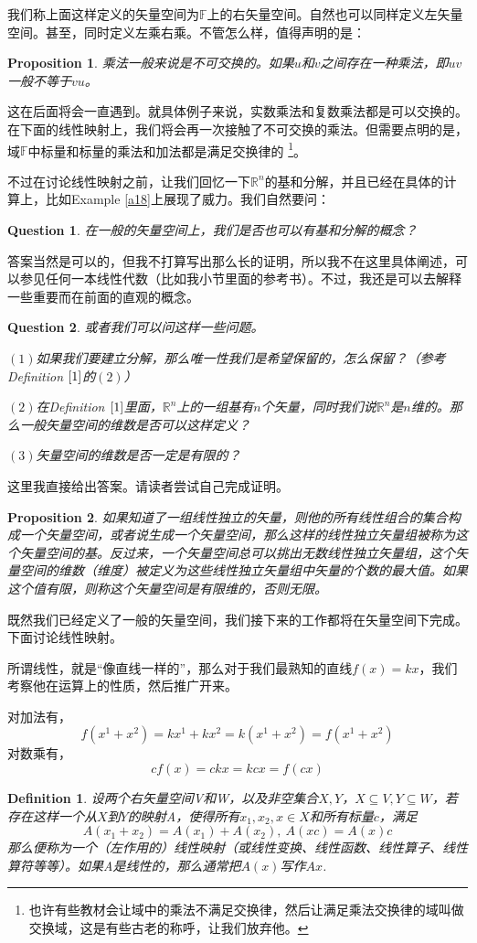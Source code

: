 \documentclass[11pt,a4paper,openany]{book}%
\theoremstyle{plain}%
\newtheorem{pro}{Proposition}[chapter]%
\newtheorem{que}{Question}[chapter]%
\newtheorem{defi}{Definition}[chapter]%
\newcommand{\NO}[1]{{$(#1)$}}%
\newcommand{\dref}[1]{{\rm Definition} $\ref{#1}$}%
\begin{document}
我们称上面这样定义的矢量空间为$\mathbb{F}$上的右矢量空间。自然也可以同样定义左矢量空间。甚至，同时定义左乘右乘。不管怎么样，值得声明的是：
\begin{pro}
\label{乘法}
乘法一般来说是不可交换的。如果$u$和$v$之间存在一种乘法，即$uv$一般不等于$vu$。
\end{pro}
这在后面将会一直遇到。就具体例子来说，实数乘法和复数乘法都是可以交换的。在下面的线性映射上，我们将会再一次接触了不可交换的乘法。但需要点明的是，域$\mathbb{F}$中标量和标量的乘法和加法都是满足交换律的
\footnote{也许有些教材会让域中的乘法不满足交换律，然后让满足乘法交换律的域叫做交换域，这是有些古老的称呼，让我们放弃他。}。

\indent 不过在讨论线性映射之前，让我们回忆一下$\mathbb{R}^{n}$的基和分解，并且已经在具体的计算上，比如Example \ref{a18}上展现了威力。我们自然要问：
\begin{que}
\label{a14}
在一般的矢量空间上，我们是否也可以有基和分解的概念？
\end{que}

答案当然是可以的，但我不打算写出那么长的证明，所以我不在这里具体阐述，可以参见任何一本线性代数（比如我小节里面的参考书）。不过，我还是可以去解释一些重要而在前面的直观的概念。
\begin{que}\label{a15}或者我们可以问这样一些问题。

\NO{1}如果我们要建立分解，那么唯一性我们是希望保留的，怎么保留？（参考 \dref{1}的\NO{2}）

\NO{2}在\dref{1}里面，$\mathbb{R}^{n}$上的一组基有$n$个矢量，同时我们说$\mathbb{R}^{n}$是$n$维的。那么一般矢量空间的维数是否可以这样定义？

\NO{3}矢量空间的维数是否一定是有限的？
\end{que}
这里我直接给出答案。请读者尝试自己完成证明。
\begin{pro}
\label{ji}
如果知道了一组线性独立的矢量，则他的所有线性组合的集合构成一个矢量空间，或者说生成一个矢量空间，那么这样的线性独立矢量组被称为这个矢量空间的{\kaishu 基}。反过来，一个矢量空间总可以挑出无数线性独立矢量组，这个矢量空间的维数（维度）被定义为这些线性独立矢量组中矢量的个数的最大值。如果这个值有限，则称这个矢量空间是有限维的，否则无限。
\end{pro}
既然我们已经定义了一般的矢量空间，我们接下来的工作都将在矢量空间下完成。下面讨论线性映射。

所谓线性，就是“像直线一样的”，那么对于我们最熟知的直线$f(x)=kx$，我们考察他在运算上的性质，然后推广开来。

对加法有，
\[
f(x^{1}+x^{2})=kx^{1}+kx^{2}=k(x^1+x^2)=f(x^1+x^2)
\]
\indent 对数乘有，
\[
cf(x)=ckx=kcx=f(cx)
\]
\begin{defi}
设两个右矢量空间V和W，以及非空集合$X,Y$，$X\subseteq V,Y\subseteq W$，若存在这样一个从$X$到$Y$的映射A，使得所有$x_{1},x_{2},x \in X$和所有标量$c$，满足
\[
A(x_{1}+x_{2})=A(x_{1})+A(x_{2}),\ A(xc)=A(x)c
\]
那么便称为一个（左作用的）线性映射（或线性变换、线性函数、线性算子、线性算符等等）。如果A是线性的，那么通常把$A(x)$写作$Ax$.
\end{defi}
\end{document}
